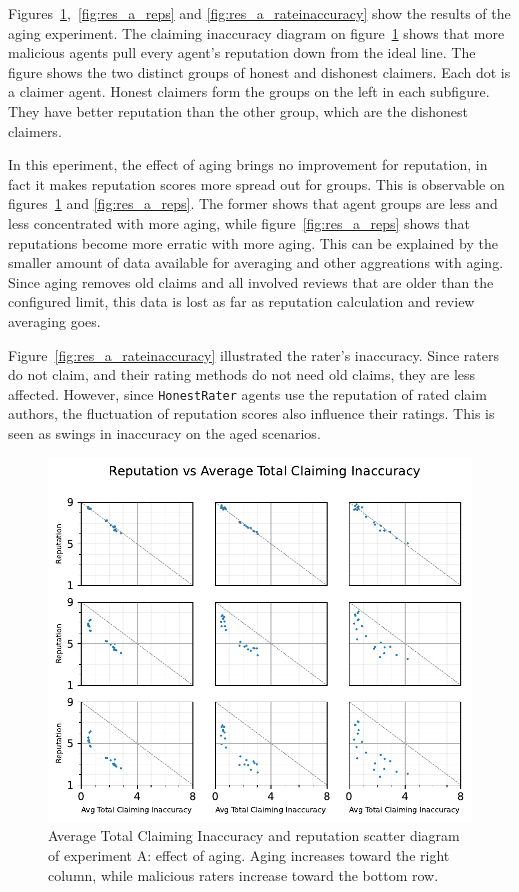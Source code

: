 \documentclass[%
    ]{\PathToTumTemplate/thesis/tum_thesis}
\begin{document}
Figures~\ref{fig:res_a_scatter},~\ref{fig:res_a_reps} and \ref{fig:res_a_rateinaccuracy} show the results of the aging experiment.
The claiming inaccuracy diagram on figure~\ref{fig:res_a_scatter} shows that more malicious agents pull every agent's reputation down from the ideal line.
The figure shows the two distinct groups of honest and dishonest claimers.
Each dot is a claimer agent.
Honest claimers form the groups on the left in each subfigure.
They have better reputation than the other group, which are the dishonest claimers.

In this eperiment, the effect of aging brings no improvement for reputation, in fact it makes reputation scores more spread out for groups.
This is observable on figures~\ref{fig:res_a_scatter} and \ref{fig:res_a_reps}.
The former shows that agent groups are less and less concentrated with more aging, while figure~\ref{fig:res_a_reps} shows that reputations become more erratic with more aging.
This can be explained by the smaller amount of data available for averaging and other aggreations with aging.
Since aging removes old claims and all involved reviews that are older than the configured limit, this data is lost as far as reputation calculation and review averaging goes.

Figure~\ref{fig:res_a_rateinaccuracy} illustrated the rater's inaccuracy. Since raters do not claim, and their rating methods do not need old claims, they are less affected. 
However, since \texttt{HonestRater} agents use the reputation of rated claim authors, the fluctuation of reputation scores also influence their ratings. 
This is seen as swings in inaccuracy on the aged scenarios.

\begin{figure}[tbp]
  \begin{center}
        \includegraphics[width=0.75\linewidth]	{../results/a/AvgTotClaimInaccuracyAndReputationScatter_joined.pdf}
    \caption{
    Average Total Claiming Inaccuracy and reputation scatter diagram of experiment A: effect of aging.
    Aging increases toward the right column, while malicious raters increase toward the bottom row.
    }
    \label{fig:res_a_scatter}
  \end{center}
\end{figure}
\end{document}
